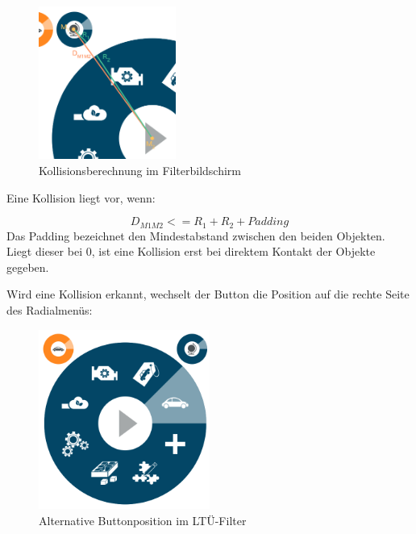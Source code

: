 \begin{figure}[H]
 \centering
 \includegraphics[width=0.4\textwidth]{grafiken/radius.png}
 \caption{Kollisionsberechnung im Filterbildschirm}
 \label{fig:collisionFilter}
\end{figure}
Eine Kollision liegt vor, wenn:\par
\begin{equation}
	D_{M1M2} <= R_1 + R_2 + Padding
\end{equation}
Das Padding bezeichnet den Mindestabstand zwischen den beiden Objekten. Liegt dieser bei 0, ist eine Kollision erst bei direktem Kontakt der Objekte gegeben.\par
Wird eine Kollision erkannt, wechselt der Button die Position auf die rechte Seite des Radialmenüs:
\begin{figure}[H]
 \centering
 \includegraphics[width=0.5\textwidth]{grafiken/fix_filter.png}
 \caption{Alternative Buttonposition im LTÜ-Filter}
 \label{fig:fixFilter}
\end{figure}